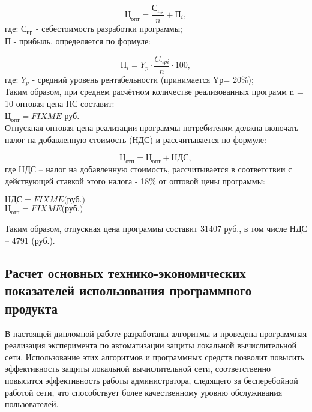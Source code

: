 \begin{equation}
\mbox{Ц}_{\mbox{опт}} = \frac{\mbox{С}_{\mbox{пр}}}{n} + \mbox{П}_i,
\end{equation}
где:	${\mbox{С}_{\mbox{пр}}}$ - себестоимость разработки программы; \\
	${\mbox{П}}$ - прибыль, определяется по формуле:

\begin{equation}
\mbox{П}_i = Y_p \cdot \frac{C_{npi}}{n} \cdot 100,
\end{equation}
где:	${Y_p}$ -  средний уровень рентабельности (принимается Yр= 20\%);\\

Таким образом, при среднем расчётном количестве реализованных программ n = 10 оптовая цена ПС составит: \\
${\mbox{Ц}_{\mbox{опт}} = FIXME}$ руб. \\

Отпускная оптовая цена реализации программы потребителям должна включать налог на добавленную
стоимость (НДС) и рассчитывается по формуле:

\begin{equation}
\mbox{Ц}_{\mbox{отп}} = \mbox{Ц}_{\mbox{опт}} + \mbox{НДС},
\end{equation}
где НДС – налог на добавленную стоимость,  рассчитывается в соответствии с действующей ставкой этого
налога - 18\% от оптовой цены программы:

\begin{center}
${\mbox{НДС} = FIXME \mbox{(руб.)}}$ \\
${\mbox{Ц}_{\mbox{отп}} = FIXME \mbox{(руб.)}}$
\end{center}

Таким образом, отпускная цена программы составит  31407  руб.,  в том числе НДС – 4791 (руб.).

\subsection{Расчет основных технико-экономических показателей использования программного продукта}
В настоящей дипломной работе  разработаны алгоритмы и проведена программная реализация эксперимента по
автоматизации защиты локальной вычислительной сети. Использование этих алгоритмов и программных средств 
позволит повысить эффективность защиты локальной вычислительной сети, соответственно повысится эффективность
работы администратора, следящего за бесперебойной работой сети, что способствует более качественному уровню
обслуживания пользователей.



\newpage
